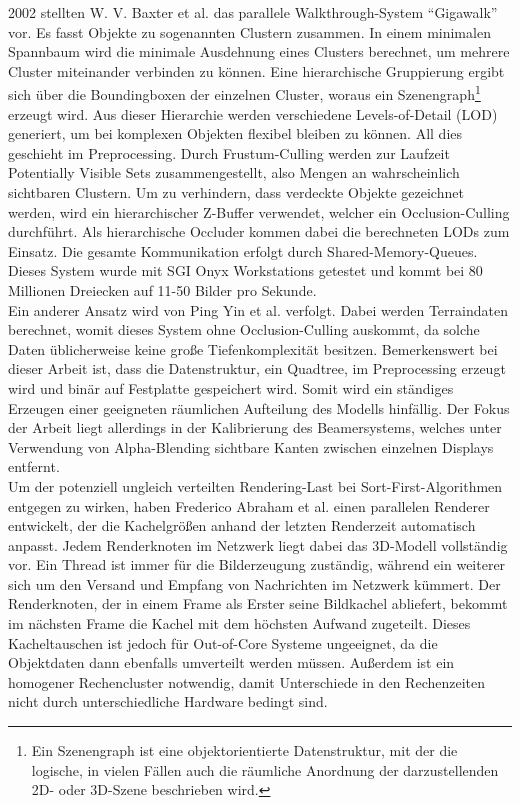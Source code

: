 2002 stellten W. V. Baxter et al. \cite{baxter} das parallele Walkthrough-System "`Gigawalk"' vor. Es fasst Objekte zu sogenannten Clustern zusammen. In einem minimalen Spannbaum wird die minimale Ausdehnung eines Clusters berechnet, um mehrere Cluster miteinander verbinden zu können. Eine hierarchische Gruppierung ergibt sich über die Boundingboxen der einzelnen Cluster, woraus ein Szenengraph\footnote{Ein Szenengraph ist eine objektorientierte Datenstruktur, mit der die logische, in vielen Fällen auch die räumliche Anordnung der darzustellenden 2D- oder 3D-Szene beschrieben wird.} erzeugt wird. Aus dieser Hierarchie werden verschiedene Levels-of-Detail (LOD)\cite{hlod} generiert, um bei komplexen Objekten flexibel bleiben zu können. All dies geschieht im Preprocessing. Durch Frustum-Culling werden zur Laufzeit Potentially Visible Sets \cite{RTR3} zusammengestellt, also Mengen an wahrscheinlich sichtbaren Clustern. Um zu verhindern, dass verdeckte Objekte gezeichnet werden, wird ein hierarchischer Z-Buffer verwendet, welcher ein Occlusion-Culling durchführt. Als hierarchische Occluder kommen dabei die berechneten LODs zum Einsatz. Die gesamte Kommunikation erfolgt durch Shared-Memory-Queues. Dieses System wurde mit SGI Onyx Workstations getestet und kommt bei 80 Millionen Dreiecken auf 11-50 Bilder pro Sekunde.\\
Ein anderer Ansatz wird von Ping Yin et al. \cite{DBLP:journals/ijvr/YinJSZ06} verfolgt. Dabei werden Terraindaten berechnet, womit dieses System ohne Occlusion-Culling auskommt, da solche Daten üblicherweise keine große Tiefenkomplexität besitzen. Bemerkenswert bei dieser Arbeit ist, dass die Datenstruktur, ein Quadtree, im Preprocessing erzeugt wird und binär auf Festplatte gespeichert wird. Somit wird ein ständiges Erzeugen einer geeigneten räumlichen Aufteilung des Modells hinfällig. Der Fokus der Arbeit liegt allerdings in der Kalibrierung des Beamersystems, welches unter Verwendung von Alpha-Blending sichtbare Kanten zwischen einzelnen Displays entfernt.\\
Um der potenziell ungleich verteilten Rendering-Last bei Sort-First-Algorithmen entgegen zu wirken, haben Frederico Abraham et al. \cite{abraham} einen parallelen Renderer entwickelt, der die Kachelgrößen anhand der letzten Renderzeit automatisch anpasst. Jedem Renderknoten im Netzwerk liegt dabei das 3D-Modell vollständig vor. Ein Thread ist immer für die Bilderzeugung zuständig, während ein weiterer sich um den Versand und Empfang von Nachrichten im Netzwerk kümmert. Der Renderknoten, der in einem Frame als Erster seine Bildkachel abliefert, bekommt im nächsten Frame die Kachel mit dem höchsten Aufwand zugeteilt. Dieses Kacheltauschen ist jedoch für Out-of-Core Systeme ungeeignet, da die Objektdaten dann ebenfalls umverteilt werden müssen. Außerdem ist ein homogener Rechencluster notwendig, damit Unterschiede in den Rechenzeiten nicht durch unterschiedliche Hardware bedingt sind.

